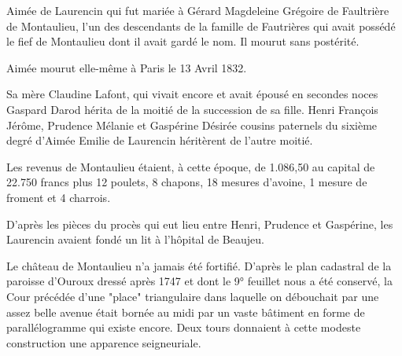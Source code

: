 Aimée de Laurencin qui fut mariée à Gérard Magdeleine Grégoire de Faultrière de Montaulieu, l'un des descendants de la famille de Fautrières qui avait possédé le fief de Montaulieu dont il avait gardé le nom. Il mourut sans postérité.

Aimée mourut elle-même à Paris le 13 Avril 1832.

Sa mère Claudine Lafont, qui vivait encore et avait épousé en secondes noces Gaspard Darod hérita de la moitié de la succession de sa fille. Henri François Jérôme, Prudence Mélanie et Gaspérine Désirée cousins paternels du sixième degré d'Aimée Emilie de Laurencin héritèrent de l'autre moitié.

Les revenus de Montaulieu étaient, à cette époque, de 1.086,50 au capital de 22.750 francs plus 12 poulets, 8 chapons, 18 mesures d'avoine, 1 mesure de froment et 4 charrois.

D'après les pièces du procès qui eut lieu entre Henri, Prudence et Gaspérine, les Laurencin avaient fondé un lit à l'hôpital de Beaujeu.

Le château de Montaulieu n'a jamais été fortifié. D'après le plan cadastral de la paroisse d'Ouroux dressé après 1747 et dont le 9° feuillet nous a été conservé, la Cour précédée d'une "place" triangulaire dans laquelle on débouchait par une assez belle avenue était bornée au midi par un vaste bâtiment en forme de parallélogramme qui existe encore. Deux tours donnaient à cette modeste construction une apparence seigneuriale.
